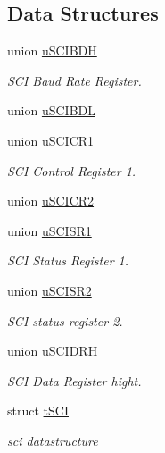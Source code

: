 \subsection*{Data Structures}
\begin{DoxyCompactItemize}
\item 
union \hyperlink{unionu_s_c_i_b_d_h}{u\+S\+C\+I\+B\+D\+H}
\begin{DoxyCompactList}\small\item\em S\+C\+I Baud Rate Register. \end{DoxyCompactList}\item 
union \hyperlink{unionu_s_c_i_b_d_l}{u\+S\+C\+I\+B\+D\+L}
\item 
union \hyperlink{unionu_s_c_i_c_r1}{u\+S\+C\+I\+C\+R1}
\begin{DoxyCompactList}\small\item\em S\+C\+I Control Register 1. \end{DoxyCompactList}\item 
union \hyperlink{unionu_s_c_i_c_r2}{u\+S\+C\+I\+C\+R2}
\item 
union \hyperlink{unionu_s_c_i_s_r1}{u\+S\+C\+I\+S\+R1}
\begin{DoxyCompactList}\small\item\em S\+C\+I Status Register 1. \end{DoxyCompactList}\item 
union \hyperlink{unionu_s_c_i_s_r2}{u\+S\+C\+I\+S\+R2}
\begin{DoxyCompactList}\small\item\em S\+C\+I status register 2. \end{DoxyCompactList}\item 
union \hyperlink{unionu_s_c_i_d_r_h}{u\+S\+C\+I\+D\+R\+H}
\begin{DoxyCompactList}\small\item\em S\+C\+I Data Register hight. \end{DoxyCompactList}\item 
struct \hyperlink{structt_s_c_i}{t\+S\+C\+I}
\begin{DoxyCompactList}\small\item\em sci datastructure \end{DoxyCompactList}\end{DoxyCompactItemize}
